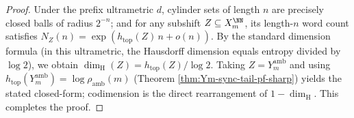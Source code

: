 \begin{proof}
Under the prefix ultrametric \(d\), cylinder sets of length \(n\) are precisely closed balls of radius \(2^{-n}\); and for any subshift \(Z\subseteq X_m^{\NN}\), its length-\(n\) word count satisfies
\(
N_Z(n)=\exp(h_{\mathrm{top}}(Z)\,n+o(n))
\).
By the standard dimension formula (in this ultrametric, the Hausdorff dimension equals entropy divided by \(\log 2\)), we obtain
\(
\dim_{\mathrm H}(Z)=h_{\mathrm{top}}(Z)/\log 2
\).
Taking \(Z=Y_m^{\mathrm{amb}}\) and using \(h_{\mathrm{top}}(Y_m^{\mathrm{amb}})=\log\rho_{\mathrm{amb}}(m)\) (Theorem \ref{thm:Ym-sync-tail-pf-sharp}) yields the stated closed-form; codimension is the direct rearrangement of \(1-\dim_{\mathrm H}\). This completes the proof.
\end{proof}

